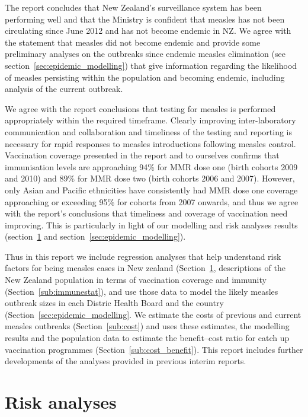 \documentclass{article}
\begin{document}
\begin{itemize}
The report concludes that New Zealand's surveillance system has been performing well and that the Ministry is confident that measles has not been circulating since June 2012 and has not become endemic in NZ. We agree with the statement that measles did not become endemic and provide some preliminary analyses on the outbreaks since endemic measles elimination (see section~\ref{sec:epidemic_modelling}) that give information regarding the likelihood of measles persisting within the population and becoming endemic, including analysis of the current outbreak.

We agree with the report conclusions that testing for measles is performed appropriately within the required timeframe. Clearly improving inter-laboratory communication and collaboration and timeliness of the testing and reporting is necessary for rapid responses to measles introductions following measles control. Vaccination coverage presented in the report and to ourselves confirms that immunisation levels are approaching 94\% for MMR dose one (birth cohorts 2009 and 2010) and 89\% for MMR dose two (birth cohorts 2006 and 2007). However, only Asian and Pacific ethnicities have consistently had MMR dose one coverage approaching or exceeding 95\% for cohorts from 2007 onwards, and thus we agree with the report's conclusions that timeliness and coverage of vaccination need improving. This is particularly in light of our modelling and risk analyses results (section~\ref{sub:risk_analyses} and section~\ref{sec:epidemic_modelling}).

Thus in this report we include regression analyses that help understand risk factors for being measles cases in New zealand (Section~\ref{sub:risk_analyses}, descriptions of the New Zealand population in terms of vaccination coverage and immunity (Section~\ref{sub:immunestat}), and use those data to model the likely measles outbreak sizes in each Distric Health Board and the country (Section~\ref{sec:epidemic_modelling}. We estimate the costs of previous and current measles outbreaks (Section~\ref{sub:cost}) and uses these estimates, the modelling results and the population data to estimate the benefit--cost ratio for catch up vaccination programmes (Section~\ref{sub:cost_benefit}). This report includes further developments of the analyses provided in previous interim reports.

\section{Risk analyses}
\label{sub:risk_analyses}


\end{itemize}
\end{document}
